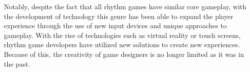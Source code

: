Notably, despite the fact that all rhythm games have similar core gameplay, with the development of technology this genre has been able to expand the player experience through the use of new input devices and unique approaches to gameplay. With the rise of technologies such as virtual reality or touch screens, rhythm game developers have utilized new solutions to create new experiences. Because of this, the creativity of game designers is no longer limited as it was in the past.